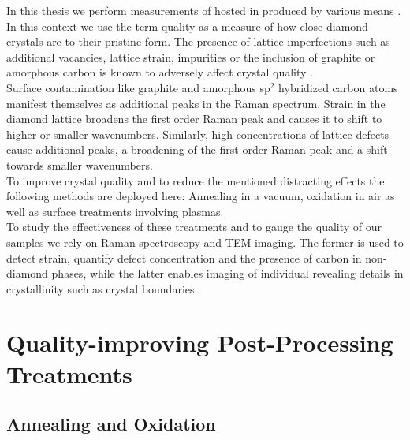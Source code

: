 		In this thesis we perform measurements of \sivs hosted in \nds produced by various means .
		In this context we use the term quality as a measure of how close diamond crystals are to their pristine form.
		The presence of lattice imperfections such as additional vacancies, lattice strain, impurities or the inclusion of graphite or amorphous carbon is known to adversely affect crystal quality \cite{Zaitsev2001,Prawer2004,Orwa2000}.
		\\
		Surface contamination like graphite and amorphous sp$^2$ hybridized carbon atoms manifest themselves as additional peaks in the Raman spectrum.
		Strain in the diamond lattice broadens the first order Raman peak and causes it to shift to higher or smaller wavenumbers.
		Similarly, high concentrations of lattice defects cause additional peaks, a broadening of the first order Raman peak and a shift towards smaller wavenumbers.
		\\
		To improve crystal quality and to reduce the mentioned distracting effects the following methods are deployed here: Annealing in a vacuum, oxidation in air as well as surface treatments involving plasmas.
		\\
		To study the effectiveness of these treatments and to gauge the quality of our \nd samples we rely on Raman spectroscopy and TEM imaging. The former is used to detect strain, quantify defect concentration and the presence of carbon in non-diamond phases, while the latter enables imaging of individual \nds revealing details in crystallinity such as crystal boundaries.

		\section{Quality-improving Post-Processing Treatments}

			\subsection{Annealing and Oxidation}\label{subsec::ann_ox}

